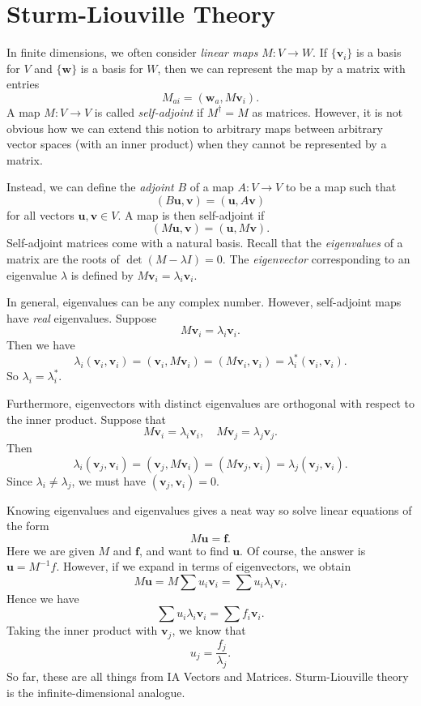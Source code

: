 \documentclass[a4paper]{article}
\begin{document}
\section{Sturm-Liouville Theory}
In finite dimensions, we often consider \emph{linear maps} $M: V\to W$. If $\{\mathbf{v}_i\}$ is a basis for $V$ and $\{\mathbf{w}\}$ is a basis for $W$, then we can represent the map by a matrix with entries
\[
  M_{ai} = (\mathbf{w}_a, M\mathbf{v}_i).
\]
A map $M: V\to V$ is called \emph{self-adjoint} if $M^\dagger = M$ as matrices. However, it is not obvious how we can extend this notion to arbitrary maps between arbitrary vector spaces (with an inner product) when they cannot be represented by a matrix.

Instead, we can define the \emph{adjoint} $B$ of a map $A: V\to V$ to be a map such that
\[
  (B\mathbf{u}, \mathbf{v}) = (\mathbf{u}, A\mathbf{v})
\]
for all vectors $\mathbf{u}, \mathbf{v}\in V$. A map is then self-adjoint if
\[
  (M\mathbf{u}, \mathbf{v}) = (\mathbf{u}, M\mathbf{v}).
\]
Self-adjoint matrices come with a natural basis. Recall that the \emph{eigenvalues} of a matrix are the roots of $\det(M - \lambda I) = 0$. The \emph{eigenvector} corresponding to an eigenvalue $\lambda$ is defined by $M\mathbf{v}_i = \lambda_i \mathbf{v}_i$.

In general, eigenvalues can be any complex number. However, self-adjoint maps have \emph{real} eigenvalues. Suppose
\[
  M\mathbf{v}_i = \lambda_i \mathbf{v}_i.
\]
Then we have
\[
  \lambda_i (\mathbf{v}_i, \mathbf{v}_i) = (\mathbf{v}_i, M\mathbf{v}_i) = (M\mathbf{v}_i, \mathbf{v}_i) = \lambda_i^* (\mathbf{v}_i, \mathbf{v}_i).
\]
So $\lambda_i = \lambda_i^*$.

Furthermore, eigenvectors with distinct eigenvalues are orthogonal with respect to the inner product. Suppose that
\[
  M \mathbf{v}_i = \lambda_i \mathbf{v}_i,\quad M \mathbf{v}_j = \lambda_j \mathbf{v}_j.
\]
Then
\[
  \lambda_i (\mathbf{v}_j, \mathbf{v}_i) = (\mathbf{v}_j, M\mathbf{v}_i) = (M\mathbf{v}_j, \mathbf{v}_i) = \lambda_j(\mathbf{v}_j, \mathbf{v}_i).
\]
Since $\lambda_i \not= \lambda_j$, we must have $(\mathbf{v}_j, \mathbf{v}_i) = 0$.

Knowing eigenvalues and eigenvalues gives a neat way so solve linear equations of the form
\[
  M \mathbf{u} = \mathbf{f}.
\]
Here we are given $M$ and $\mathbf{f}$, and want to find $\mathbf{u}$. Of course, the answer is $\mathbf{u} = M^{-1}f$. However, if we expand in terms of eigenvectors, we obtain
\[
  M\mathbf{u} = M\sum u_i \mathbf{v}_i = \sum u_i \lambda_i \mathbf{v}_i.
\]
Hence we have
\[
  \sum u_i \lambda_i \mathbf{v}_i = \sum f_i \mathbf{v}_i.
\]
Taking the inner product with $\mathbf{v}_j$, we know that
\[
  u_j = \frac{f_j}{\lambda_j}.
\]
So far, these are all things from IA Vectors and Matrices. Sturm-Liouville theory is the infinite-dimensional analogue.
\end{document}
